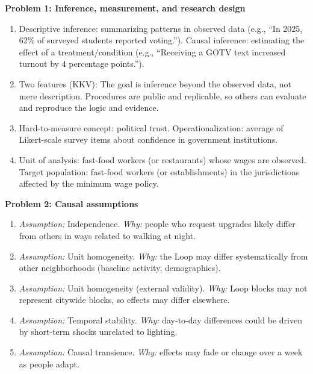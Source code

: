 \documentclass[12pt]{article}
\begin{document}
\noindent\textbf{Problem 1: Inference, measurement, and research design}
\begin{enumerate}[label=\arabic*.]
  \item Descriptive inference: summarizing patterns in observed data (e.g., ``In 2025, 62\% of surveyed students reported voting.''). Causal inference: estimating the effect of a treatment/condition (e.g., ``Receiving a GOTV text increased turnout by 4 percentage points.'').
  \item Two features (KKV): The goal is inference beyond the observed data, not mere description. Procedures are public and replicable, so others can evaluate and reproduce the logic and evidence.
  \item Hard-to-measure concept: political trust. Operationalization: average of Likert-scale survey items about confidence in government institutions.
  \item Unit of analysis: fast-food workers (or restaurants) whose wages are observed. Target population: fast-food workers (or establishments) in the jurisdictions affected by the minimum wage policy.
\end{enumerate}

\vspace{0.5em}
\noindent\textbf{Problem 2: Causal assumptions}
\begin{enumerate}[label=\arabic*.]
  \item \emph{Assumption:} Independence. \emph{Why:} people who request upgrades likely differ from others in ways related to walking at night.
  \item \emph{Assumption:} Unit homogeneity. \emph{Why:} the Loop may differ systematically from other neighborhoods (baseline activity, demographics).
  \item \emph{Assumption:} Unit homogeneity (external validity). \emph{Why:} Loop blocks may not represent citywide blocks, so effects may differ elsewhere.
  \item \emph{Assumption:} Temporal stability. \emph{Why:} day-to-day differences could be driven by short-term shocks unrelated to lighting.
  \item \emph{Assumption:} Causal transience. \emph{Why:} effects may fade or change over a week as people adapt.
\end{enumerate}
\end{document}
